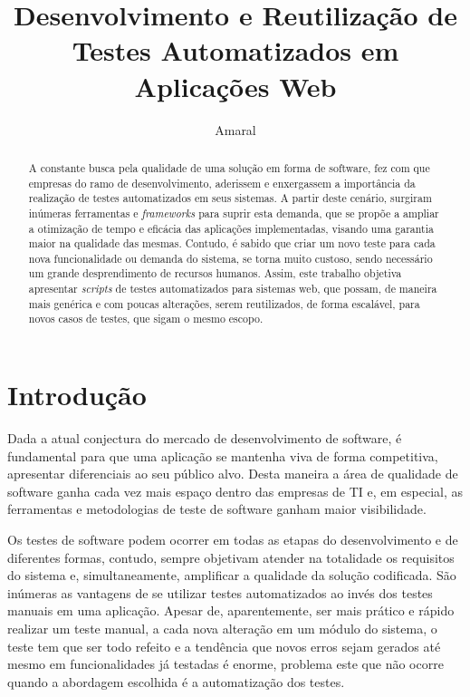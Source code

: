 \documentclass[tg]{mdtufsm}
\title{Desenvolvimento e Reutilização de Testes Automatizados em Aplicações Web}
\author{Amaral}{Lucas Antunes}
\institute{Centro de Tecnologia}
\date{}{Outubro}{2014}
\begin{document}
\maketitle
\makeapprove

\begin{abstract}
A constante busca pela qualidade de uma solução em forma de software, fez com que empresas do ramo de desenvolvimento,
aderissem e enxergassem a importância da realização de testes automatizados em seus sistemas. A partir deste cenário,
surgiram inúmeras ferramentas e \emph{frameworks} para suprir esta demanda, que se propõe  a ampliar a otimização de tempo e
eficácia das aplicações implementadas, visando uma garantia maior na qualidade das mesmas. Contudo, é sabido que criar
um novo teste para cada nova funcionalidade ou demanda do sistema, se torna muito custoso, sendo necessário um grande
desprendimento de recursos humanos. Assim, este trabalho objetiva apresentar \emph{scripts} de testes automatizados para
sistemas web, que possam, de maneira mais genérica e com poucas alterações, serem reutilizados, de forma escalável,
para novos casos de testes, que sigam o mesmo escopo.
\end{abstract}

\tableofcontents

\setlength{\baselineskip}{1.5\baselineskip}

\chapter{Introdução}

Dada a atual conjectura do mercado de desenvolvimento de software, é fundamental para
que uma aplicação se mantenha viva de forma competitiva, apresentar diferenciais ao seu público alvo. Desta
maneira a área de qualidade de software ganha cada vez mais espaço dentro das empresas de TI e, em especial, as ferramentas e
metodologias de teste de software ganham maior visibilidade.

Os testes de software podem ocorrer em todas as etapas do desenvolvimento e de diferentes formas, contudo,
sempre objetivam atender na totalidade os requisitos do sistema e, simultaneamente, amplificar a qualidade da solução
codificada. São inúmeras as vantagens de se utilizar testes automatizados ao invés dos testes manuais em uma aplicação.
Apesar de, aparentemente, ser mais prático e rápido realizar um teste manual, a cada nova alteração em um módulo do sistema,
o teste tem que ser todo refeito e a tendência que novos erros sejam gerados até mesmo em funcionalidades já testadas é enorme,
problema este que não ocorre quando a abordagem escolhida é a automatização dos testes.
\end{document}
